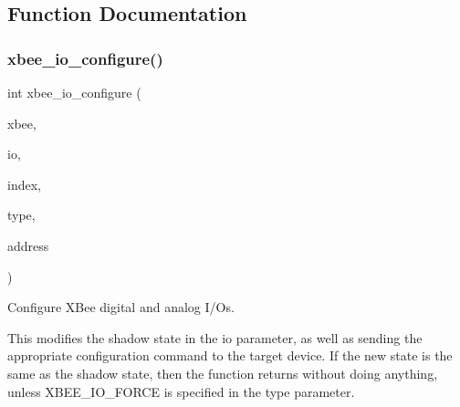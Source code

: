 \subsection{Function Documentation}
\mbox{\label{group__xbee__io_ga0734acd149ca45fa8041d426f552e51a}} 
\subsubsection{\texorpdfstring{xbee\+\_\+io\+\_\+configure()}{xbee\_io\_configure()}}
{\footnotesize\ttfamily int xbee\+\_\+io\+\_\+configure (\begin{DoxyParamCaption}\item[{\hyperlink{structxbee__dev__t}{xbee\+\_\+dev\+\_\+t} $\ast$}]{xbee,  }\item[{\hyperlink{structxbee__io__t}{xbee\+\_\+io\+\_\+t} \hyperlink{group__hal_gaef060b3456fdcc093a7210a762d5f2ed}{F\+AR} $\ast$}]{io,  }\item[{uint\+\_\+fast8\+\_\+t}]{index,  }\item[{enum \hyperlink{group__xbee__io_gac23a55c53310f865d9ed2381e331a438}{xbee\+\_\+io\+\_\+type}}]{type,  }\item[{const \hyperlink{structwpan__address__t}{wpan\+\_\+address\+\_\+t} \hyperlink{group__hal_gaef060b3456fdcc093a7210a762d5f2ed}{F\+AR} $\ast$}]{address }\end{DoxyParamCaption})}



Configure X\+Bee digital and analog I/\+Os. 

This modifies the shadow state in the io parameter, as well as sending the appropriate configuration command to the target device. If the new state is the same as the shadow state, then the function returns without doing anything, unless X\+B\+E\+E\+\_\+\+I\+O\+\_\+\+F\+O\+R\+CE is specified in the type parameter.


